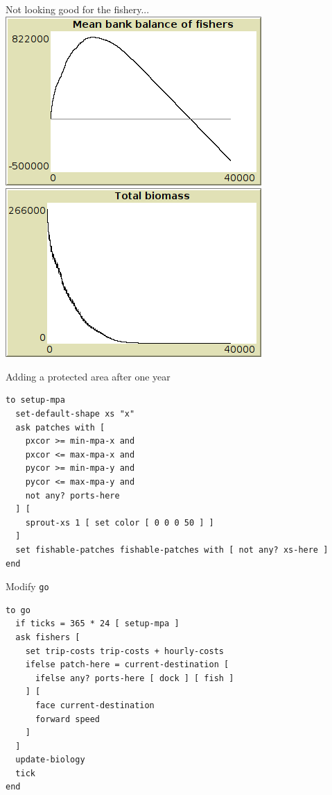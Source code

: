 \documentclass[table, 14pt, aspectratio=169]{beamer}
\begin{document}
\begin{frame}{Not looking good for the fishery...}
  \includegraphics[width=0.49\linewidth]{images/business-as-usual-balance.png}
  \hfill
  \includegraphics[width=0.49\linewidth]{images/business-as-usual-biomass.png}
\end{frame}

\begin{frame}[fragile=singleslide]{Adding a protected area after one year}
  \begin{adjustbox}{max height=0.8\textheight, max width = \linewidth}
    \begin{verbatim}
to setup-mpa
  set-default-shape xs "x"
  ask patches with [ 
    pxcor >= min-mpa-x and 
    pxcor <= max-mpa-x and 
    pycor >= min-mpa-y and
    pycor <= max-mpa-y and
    not any? ports-here
  ] [
    sprout-xs 1 [ set color [ 0 0 0 50 ] ]
  ]
  set fishable-patches fishable-patches with [ not any? xs-here ]
end
    \end{verbatim}
  \end{adjustbox}
\end{frame}

\begin{frame}[fragile=singleslide]{Modify \texttt{go}}
  \begin{adjustbox}{max height=0.8\textheight, max width = \linewidth}
    \begin{verbatim}
to go
  if ticks = 365 * 24 [ setup-mpa ]
  ask fishers [
    set trip-costs trip-costs + hourly-costs
    ifelse patch-here = current-destination [
      ifelse any? ports-here [ dock ] [ fish ]
    ] [
      face current-destination
      forward speed
    ]
  ]
  update-biology
  tick
end
    \end{verbatim}
  \end{adjustbox}
\end{frame}
\end{document}
